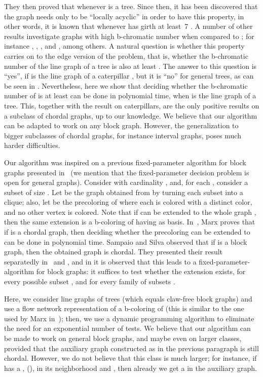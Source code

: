 \documentclass{llncs}
\begin{document}
They then proved that  whenever  is a tree. Since then, it has been discovered that the graph needs only to be ``locally acyclic'' in order to have this property, in other words, it is known that  whenever  has girth at least~7 \cite{Campos.Lima.Silva.15}. A number of other results investigate graphs with high b-chromatic number when compared to ; for instance \cite{BMZ.09}, \cite{Cabello.Jakovac.11}, \cite{KM.02}, and \cite{KRATOCHVIL.etal.02}, among others. A natural question is whether this property carries on to the edge version of the problem, that is, whether the b-chromatic number of the line graph  of a tree is also at least . The answer to this question is ``yes'', if  is the line graph of a caterpillar \cite{Campos.etal.15}, but it is ``no'' for general trees, as can be seen in \cite{MS.12}. Nevertheless, here we show that deciding whether the b-chromatic number of  is at least  can be done in polynomial time, when  is the line graph of a tree. 
This, together with the result on caterpillars, are the only positive results on a subclass of chordal graphs, up to our knowledge. We believe that our algorithm can be adapted to work on any block graph. However, the generalization to bigger subclasses of chordal graphs, for instance interval graphs, poses much harder difficulties.

Our algorithm was inspired on a previous fixed-parameter algorithm for block graphs presented in~\cite{Silva.10} (we mention that the fixed-parameter decision problem is open for general graphs).
Consider  with cardinality , and, for each , consider a subset  of size . Let  be the graph obtained from  by turning each subset  into a clique; also, let  be the precoloring of  where each  is colored with a distinct color, and no other vertex is colored. Note that if  can be extended to the whole graph , then the same extension is a b-coloring of  having  as basis. In~\cite{Marx.07}, Marx proves that if  is a chordal graph, then deciding whether the precoloring can be extended to  can be done in polynomial time. Sampaio and Silva observed that if  is a block graph, then the obtained graph  is chordal. They presented their result separatedly in~\cite{HLS.11} and \cite{Silva.10}, and in \cite{Silva.10} it is observed that this leads to a fixed-parameter-algorithm for block graphs: it suffices to test whether the extension exists, for every possible subset , and for every family of subsets . 


Here, we consider line graphs of trees (which equals claw-free block graphs) and use a flow network representation of a b-coloring of  (this is similar to the one used by Marx in~\cite{Marx.07}); then, we use a dynamic programming algorithm to eliminate the need for an exponential number of tests. We believe that our algorithm can be made to work on general block graphs, and maybe even on larger classes, provided that the auxiliary graph constructed as in the previous paragraph is still chordal. However, we do not believe that this class is much larger; for instance, if  has a , (), in its neighborhood and , then already we get a  in the auxiliary graph. 
\end{document}
